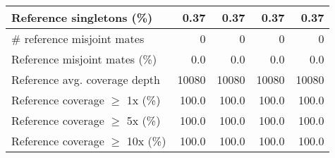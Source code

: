 \documentclass[12pt,a4paper]{article}
\begin{document}
\begin{table}[ht]
\begin{center}
\begin{tabular}{|l*{4}{|r}|}
Reference singletons (\%) & 0.37 & 0.37 & 0.37 & 0.37 \\ \hline
\# reference misjoint mates & 0 & 0 & 0 & 0 \\ \hline
Reference misjoint mates (\%) & 0.0 & 0.0 & 0.0 & 0.0 \\ \hline
Reference avg. coverage depth & 10080 & 10080 & 10080 & 10080 \\ \hline
Reference coverage $\geq$ 1x (\%) & 100.0 & 100.0 & 100.0 & 100.0 \\ \hline
Reference coverage $\geq$ 5x (\%) & 100.0 & 100.0 & 100.0 & 100.0 \\ \hline
Reference coverage $\geq$ 10x (\%) & 100.0 & 100.0 & 100.0 & 100.0 \\ \hline
\end{tabular}
\end{center}
\end{table}
\end{document}
